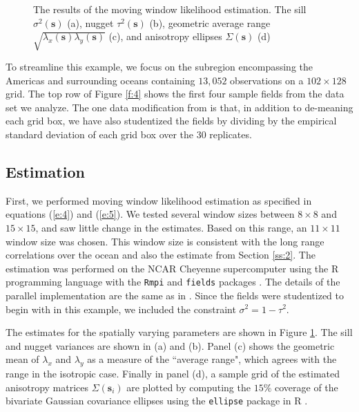 \documentclass[review]{elsarticle}
\begin{document}
\begin{figure}
    \centering
    \caption{The results of the moving window likelihood estimation. The sill $\sigma^2( \mathbf s)$ (a), nugget $\tau^2( \mathbf s)$ (b), geometric average range $\sqrt{\lambda_x ( \mathbf s) \lambda_y ( \mathbf s)}$ (c), and anisotropy ellipses $\Sigma ( \mathbf s)$ (d)}
    \label{f:3}
\end{figure}

To streamline this example, we focus on the subregion encompassing the Americas and surrounding oceans containing $13,052$ observations on a $102 \times 128$ grid. The top row of Figure \ref{f:4} shows the first four sample fields from the data set we analyze. The one data modification from \cite{nychka2018modeling} is that, in addition to de-meaning each grid box, we have also studentized the fields by dividing by the empirical standard deviation of each grid box over the 30 replicates. 

\subsection{Estimation}


First, we performed moving window likelihood estimation as specified in equations (\ref{e:4}) and (\ref{e:5}). We tested several window sizes between $8 \times 8$ and $15 \times 15$, and saw little change in the estimates.  Based on this range, an $11 \times 11$ window size was chosen. This window size is consistent with the long range correlations over the ocean and also the estimate from Section \ref{ss:2}. The estimation was performed on the NCAR Cheyenne supercomputer \cite{cheyenne} using the R programming language \cite{Rcore} with the \texttt{Rmpi} \cite{yu2002rmpi} and \texttt{fields} packages \cite{fields}. The details of the parallel implementation are the same as in \cite{nychka2018modeling}. Since the fields were studentized to begin with in this example, we included the constraint $\sigma^2 = 1 - \tau^2$.

The estimates for the spatially varying parameters are shown in Figure \ref{f:3}. The sill and nugget variances are shown in (a) and (b). Panel (c) shows the geometric mean of $\lambda_x$ and $\lambda_y$ as a measure of the ``average range", which agrees with the range in the isotropic case. Finally in panel (d), a sample grid of the estimated anisotropy matrices $\Sigma(\mathbf s_i)$ are plotted by computing the $15\%$ coverage of the bivariate Gaussian covariance ellipses using the \texttt{ellipse} package in R \cite{ellipse}.
\end{document}
